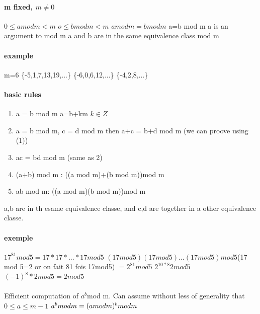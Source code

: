\documentclass[a4paper,10pt]{article}
\begin{document}
{\paragraph{m fixed, $m\neq 0$ }
$0\leq a mod m< m$
\newline
$o\leq b mod m< m$
\newline
$a mod m = b mod m$
\newline
a=b mod m
\newline
a is an argument to mod m
\newline
a and b are in the same equivalence class mod m
\paragraph{example}
m=6
\newline
\{-5,1,7,13,19,...\}
\newline
\{-6,0,6,12,...\}
\newline
\{-4,2,8,...\}
\paragraph{basic rules}
\begin{enumerate}
 \item a = b mod m a=b+km $k\in Z$
 \item a = b mod m, c = d mod m then a+c = b+d mod m (we can proove using (1))
 \item ac = bd mod m (same as 2)
 \item (a+b) mod m : ((a mod m)+(b mod m))mod m
 \item ab mod m: ((a mod m)(b mod m))mod m 
\end{enumerate}
a,b are in th esame equivalence classe, and c,d are together in a other equivalence classe.
\paragraph{exemple}
$17^{81} mod 5=17*17*...*17 mod 5$
\newline
$(17 mod 5)(17mod5)...(17mod5)mod5$(17 mod 5=2 or on fait 81 fois 17mod5)
\newline
$=2^{81}mod5$
\newline
$2^{10*8}2mod5$
\newline
$(-1)^8*2mod5=2mod5$
\paragraph{}
Efficient computation of $a^b$mod m. Can assume without less of generality that $0\leq a\leq m-1$
\newline
$a^bmod\\m=(amodm)^bmod\\m$
}
\end{document}
